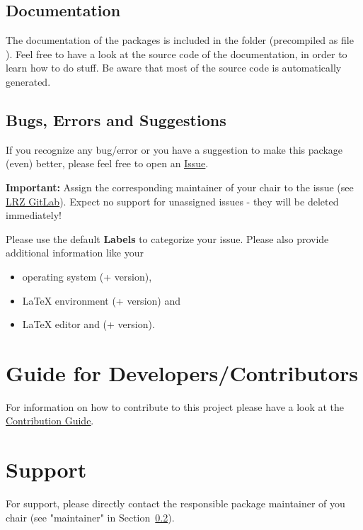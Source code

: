 \subsection{Documentation}

The documentation of the packages is included in the folder  (precompiled as file ).
Feel free to have a look at the source code of the documentation, in order to learn how to do stuff.
Be aware that most of the source code is automatically generated.

\subsection{Bugs, Errors and Suggestions}\label{bugs-errors-suggestions}

If you recognize any bug/error or you have a suggestion to make this package (even) better, please feel free to open an \underline{\href{https://gitlab.lrz.de/AM/TUMlatex/issues}{Issue}}.

\textbf{Important:} Assign the corresponding maintainer of your chair to the issue (see \underline{\href{https://gitlab.lrz.de/AM/TUMlatex}{LRZ GitLab}}).
Expect no support for unassigned issues - they will be deleted immediately!

Please use the default \textbf{Labels} to categorize your issue. Please also provide additional information like your
\begin{itemize}
    \item operating system (+ version),
    \item LaTeX environment (+ version) and
    \item LaTeX editor and (+ version).
\end{itemize}


\section{Guide for Developers/Contributors}\label{guide-for-developers}

For information on how to contribute to this project please have a look at the \underline{\href{https://gitlab.lrz.de/AM/TUMlatex/blob/develop/CONTRIBUTING.md}{Contribution Guide}}.

\section{Support}

For support, please directly contact the responsible package maintainer of you chair (see "maintainer" in Section~\ref{bugs-errors-suggestions}).

